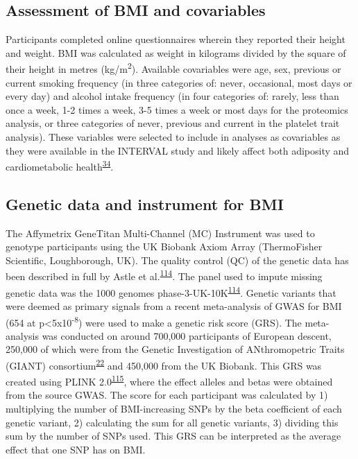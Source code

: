 \documentclass[11pt,twoside]{bristolthesis}
\begin{document}
\hypertarget{assessment-of-bmi-and-covariables}{%
\subsection{Assessment of BMI and covariables}\label{assessment-of-bmi-and-covariables}}

Participants completed online questionnaires wherein they reported their height and weight. BMI was calculated as weight in kilograms divided by the square of their height in metres (kg/m\textsuperscript{2}). Available covariables were age, sex, previous or current smoking frequency (in three categories of: never, occasional, most days or every day) and alcohol intake frequency (in four categories of: rarely, less than once a week, 1-2 times a week, 3-5 times a week or most days for the proteomics analysis, or three categories of never, previous and current in the platelet trait analysis). These variables were selected to include in analyses as covariables as they were available in the INTERVAL study and likely affect both adiposity and cardiometabolic health\textsuperscript{\protect\hyperlink{ref-Bell2018a}{34}}.

\hypertarget{genetic-data-and-instrument-for-bmi}{%
\subsection{Genetic data and instrument for BMI}\label{genetic-data-and-instrument-for-bmi}}

The Affymetrix GeneTitan Multi-Channel (MC) Instrument was used to genotype participants using the UK Biobank Axiom Array (ThermoFisher Scientific, Loughborough, UK). The quality control (QC) of the genetic data has been described in full by Astle et al.\textsuperscript{\protect\hyperlink{ref-Astle2016}{114}}. The panel used to impute missing genetic data was the 1000 genomes phase-3-UK-10K\textsuperscript{\protect\hyperlink{ref-Astle2016}{114}}. Genetic variants that were deemed as primary signals from a recent meta-analysis of GWAS for BMI (654 at p\textless5x10\textsuperscript{-8}) were used to make a genetic risk score (GRS). The meta-analysis was conducted on around 700,000 participants of European descent, 250,000 of which were from the Genetic Investigation of ANthromopetric Traits (GIANT) consortium\textsuperscript{\protect\hyperlink{ref-Locke2015}{22}} and 450,000 from the UK Biobank. This GRS was created using PLINK 2.0\textsuperscript{\protect\hyperlink{ref-Purcell2007a}{115}}, where the effect alleles and betas were obtained from the source GWAS. The score for each participant was calculated by 1) multiplying the number of BMI-increasing SNPs by the beta coefficient of each genetic variant, 2) calculating the sum for all genetic variants, 3) dividing this sum by the number of SNPs used. This GRS can be interpreted as the average effect that one SNP has on BMI.
\end{document}
